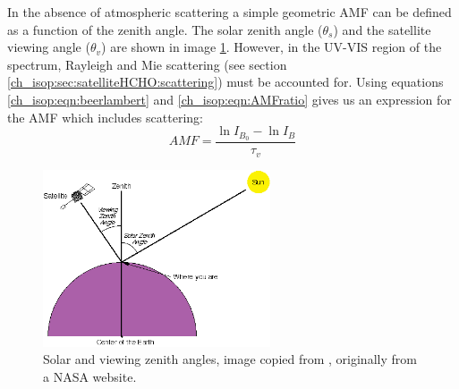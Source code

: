     In the absence of atmospheric scattering a simple geometric AMF can be defined as a function of the zenith angle. 
    The solar zenith angle ($\theta_s$) and the satellite viewing angle ($\theta_v$) are shown in image \ref{ch_isop:fig:zenithangle}.
    However, in the UV-VIS region of the spectrum, Rayleigh and Mie scattering (see section \ref{ch_isop:sec:satelliteHCHO:scattering}) must be accounted for.
    Using equations \ref{ch_isop:eqn:beerlambert} and \ref{ch_isop:eqn:AMFratio} gives us an expression for the AMF which includes scattering:
    \begin{equation} \label{ch_isop:eqn:AMFscattering}
      AMF = \frac{\ln{I_{B_0}}-\ln{I_B}}{\tau_v}
    \end{equation}

    \begin{figure}[!htbp]\begin{center}
      \includegraphics[width=0.6\textwidth]{Figures/ZenithAngles.png}
      \caption{Solar and viewing zenith angles, image copied from \citet{SZA_Image}, originally from a NASA website.}
      \label{ch_isop:fig:zenithangle}
    \end{center}\end{figure}

